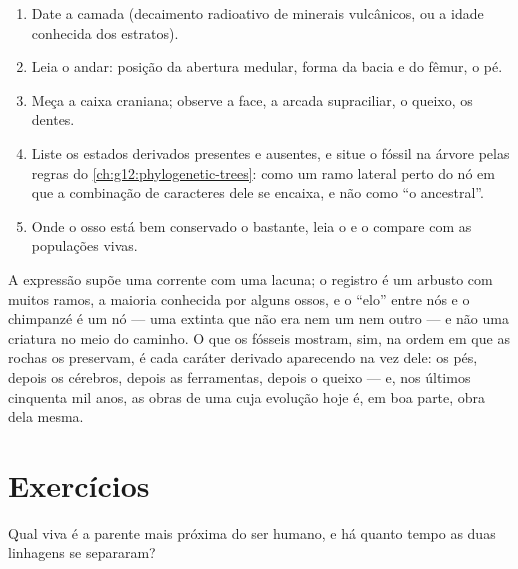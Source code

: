 \begin{method}\label{met:g12:human-evolution:placing}
\begin{enumerate}
  \item Date a camada (decaimento radioativo de minerais vulcânicos, ou
        a idade conhecida dos estratos).
  \item Leia o andar: posição da abertura medular, forma da bacia e do
        fêmur, o pé.
  \item Meça a caixa craniana; observe a face, a arcada supraciliar, o
        queixo, os dentes.
  \item Liste os estados derivados presentes e ausentes, e situe o
        fóssil na árvore pelas regras do
        \cref{ch:g12:phylogenetic-trees}: como um ramo lateral perto do
        nó em que a combinação de caracteres dele se encaixa, e não
        como ``o ancestral''.
  \item Onde o osso está bem conservado o bastante, leia o  e o
        compare com as populações vivas.
\end{enumerate}
\end{method}

\begin{remark}\label{rem:g12:human-evolution:link}
A expressão supõe uma corrente com uma lacuna; o registro é um arbusto
com muitos ramos, a maioria conhecida por alguns ossos, e o ``elo''
entre nós e o chimpanzé é um nó --- uma  extinta que não era
nem um nem outro --- e não uma criatura no meio do caminho. O que os
fósseis mostram, sim, na ordem em que as rochas os preservam, é cada
caráter derivado aparecendo na vez dele: os pés, depois os cérebros,
depois as ferramentas, depois o queixo --- e, nos últimos cinquenta mil
anos, as obras de uma  cuja evolução hoje é, em boa parte, obra dela mesma.
\end{remark}

\section{Exercícios}

\begin{exercise}[$\star$]\label{exo:g12:human-evolution:1}
Qual  viva é a parente mais próxima do ser humano, e há quanto
tempo as duas linhagens se separaram?
\end{exercise}


